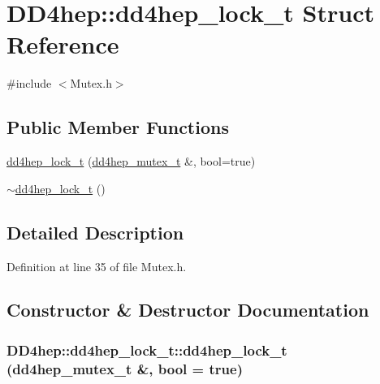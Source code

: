 \hypertarget{struct_d_d4hep_1_1dd4hep__lock__t}{
\section{DD4hep::dd4hep\_\-lock\_\-t Struct Reference}
\label{struct_d_d4hep_1_1dd4hep__lock__t}
}


{\ttfamily \#include $<$Mutex.h$>$}\subsection*{Public Member Functions}
\begin{DoxyCompactItemize}
\item 
\hyperlink{struct_d_d4hep_1_1dd4hep__lock__t_a6137b95ba1561f3e02626c363c98015f}{dd4hep\_\-lock\_\-t} (\hyperlink{struct_d_d4hep_1_1dd4hep__mutex__t}{dd4hep\_\-mutex\_\-t} \&, bool=true)
\item 
\hyperlink{struct_d_d4hep_1_1dd4hep__lock__t_a2da5cda9c173175ccd3c52a2a7c31e85}{$\sim$dd4hep\_\-lock\_\-t} ()
\end{DoxyCompactItemize}


\subsection{Detailed Description}


Definition at line 35 of file Mutex.h.

\subsection{Constructor \& Destructor Documentation}
\hypertarget{struct_d_d4hep_1_1dd4hep__lock__t_a6137b95ba1561f3e02626c363c98015f}{
\subsubsection[{dd4hep\_\-lock\_\-t}]{\setlength{\rightskip}{0pt plus 5cm}DD4hep::dd4hep\_\-lock\_\-t::dd4hep\_\-lock\_\-t ({\bf dd4hep\_\-mutex\_\-t} \&, \/  bool = {\ttfamily true})}}
\label{struct_d_d4hep_1_1dd4hep__lock__t_a6137b95ba1561f3e02626c363c98015f}


